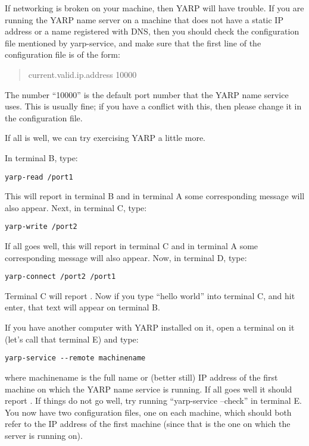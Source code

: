 If networking is broken on your machine, then YARP will have trouble.
If you are running the YARP name server on a machine that does not
have a static IP address or a name registered with DNS, then you
should check the configuration file mentioned by yarp-service, and
make sure that the first line of the configuration file is of the form:
\begin{quote}
  current.valid.ip.address 10000
\end{quote}

The number ``10000'' is the default port number that the YARP name
service uses.  This is usually fine; if you have a conflict with this,
then please change it in the configuration file.

If all is well, we can try exercising YARP a little more.

In terminal B, type:
%
\begin{verbatim}
yarp-read /port1
\end{verbatim}
%
This will report  in terminal B and in
terminal A some corresponding message will also appear.
%
Next, in terminal C, type:

\begin{verbatim}
yarp-write /port2
\end{verbatim}

If all goes well, this will report  in
terminal C and in terminal A some corresponding message will also
appear.
%
Now, in terminal D, type:

\begin{verbatim}
yarp-connect /port2 /port1
\end{verbatim}

Terminal C will report .  Now if
you type ``hello world'' into terminal C, and hit enter, that text
will appear on terminal B.

If you have another computer with YARP installed on it, open a
terminal on it (let's call that terminal E) and type:

\begin{verbatim}
yarp-service --remote machinename
\end{verbatim}

where machinename is the full name or (better still) IP address of the
first machine on which the YARP name service is running.  If all goes
well it should report .  If things do not go well, 
try running ``yarp-service --check'' in terminal E.  You now have
two configuration files, one on each machine, which should both
refer to the IP address of the first machine (since that is the one
on which the server is running on).

